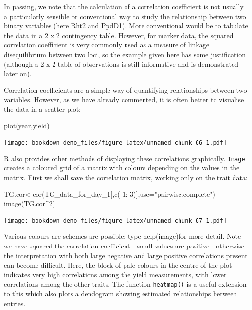 \documentclass[
]{book}
\newenvironment{Shaded}{\begin{snugshade}}{\end{snugshade}}
\newcommand{\AttributeTok}[1]{\textcolor[rgb]{0.77,0.63,0.00}{#1}}
\newcommand{\DecValTok}[1]{\textcolor[rgb]{0.00,0.00,0.81}{#1}}
\newcommand{\FunctionTok}[1]{\textcolor[rgb]{0.00,0.00,0.00}{#1}}
\newcommand{\NormalTok}[1]{#1}
\newcommand{\OtherTok}[1]{\textcolor[rgb]{0.56,0.35,0.01}{#1}}
\newcommand{\SpecialCharTok}[1]{\textcolor[rgb]{0.00,0.00,0.00}{#1}}
\newcommand{\StringTok}[1]{\textcolor[rgb]{0.31,0.60,0.02}{#1}}
\begin{document}
In passing, we note that the calculation of a correlation coefficient is not usually a particularly sensible or conventional way to study the relationship between two binary variables (here Rht2 and PpdD1). More conventional would be to tabulate the data in a 2 x 2 contingency table. However, for marker data, the squared correlation coefficient is very commonly used as a measure of linkage disequilibrium between two loci, so the example given here has some justification (although a 2 x 2 table of observations is still informative and is demonstrated later on).

Correlation coefficients are a simple way of quantifying relationships between two variables. However, as we have already commented, it is often better to visualise the data in a scatter plot:

\begin{Shaded}
\begin{Highlighting}[]
\FunctionTok{plot}\NormalTok{(year,yield)}
\end{Highlighting}
\end{Shaded}

\texttt{[image: bookdown-demo\_files/figure-latex/unnamed-chunk-66-1.pdf]}

R also provides other methods of displaying these correlations graphically. \texttt{Image} creates a coloured grid of a matrix with colours depending on the values in the matrix. First we shall save the correlation matrix, working only on the trait data:

\begin{Shaded}
\begin{Highlighting}[]
\NormalTok{TG.cor}\OtherTok{\textless{}{-}}\FunctionTok{cor}\NormalTok{(TG\_data\_for\_day\_1[,}\FunctionTok{c}\NormalTok{(}\SpecialCharTok{{-}}\DecValTok{1}\SpecialCharTok{:{-}}\DecValTok{3}\NormalTok{)],}\AttributeTok{use=}\StringTok{"pairwise.complete"}\NormalTok{)}
\FunctionTok{image}\NormalTok{(TG.cor}\SpecialCharTok{\^{}}\DecValTok{2}\NormalTok{)}
\end{Highlighting}
\end{Shaded}

\texttt{[image: bookdown-demo\_files/figure-latex/unnamed-chunk-67-1.pdf]}

Various colours are schemes are possible: type help(image)for more detail. Note we have squared the correlation coefficient - so all values are positive - otherwise the interpretation with both large negative and large positive correlations present can become difficult. Here, the block of pale colours in the centre of the plot indicates very high correlations among the yield measurements, with lower correlations among the other traits. The function \texttt{heatmap()} is a useful extension to this which also plots a dendogram showing estimated relationships between entries.
\end{document}
